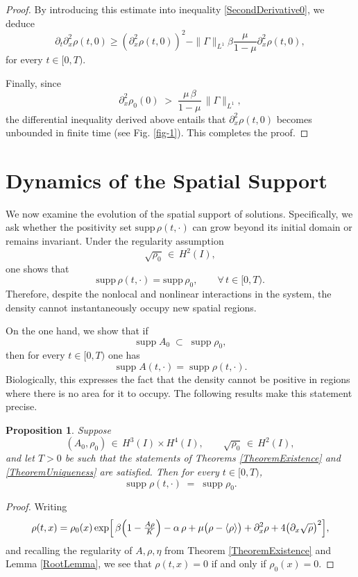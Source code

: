 \documentclass[12pt]{amsart}
\newtheorem{proposition}{Proposition}
\begin{document}
\begin{proof}
	By introducing this estimate into inequality \eqref{SecondDerivative0}, we deduce 
	\begin{equation}
		\partial_t\partial_{x}^2\rho(t,0)\geq(\partial_{x}^2\rho(t,0))^2-\|\Gamma\|_{L^1}\beta\frac{\mu}{1-\mu}\partial_{x}^2\rho(t,0),
	\end{equation}
	for every $t\in[0,T)$.
	
	Finally, since
\[
\partial_{x}^2\rho_0(0) \;>\;\frac{\mu\,\beta}{1-\mu}\,\|\Gamma\|_{L^1},
\]
the differential inequality derived above entails that $\partial_x^2\rho(t,0)$ becomes unbounded in finite time (see Fig. \ref{fig-1}). This completes the proof.  
\end{proof}

\section{Dynamics of the Spatial Support}
\label{sec5}


We now examine the evolution of the spatial support of solutions. Specifically, we ask whether the positivity set 
$\mathrm{supp}\,\rho(t,\cdot)$ can grow beyond its initial domain or remains invariant. Under the regularity assumption
\[
\sqrt{\rho_0}\,\in\,H^2(I),
\]
one shows that
\[
\mathrm{supp}\,\rho(t,\cdot)
=\mathrm{supp}\,\rho_0,
\qquad
\forall\,t\in[0,T).
\]
Therefore, despite the nonlocal and nonlinear interactions in the system, the density cannot instantaneously occupy new spatial regions.

On the one hand, we show that if 
\[
\operatorname{supp}A_{0}\;\subset\;\operatorname{supp}\rho_{0},
\]
then for every $t\in[0,T)$ one has
\[
\operatorname{supp}A(t,\cdot)
=\operatorname{supp}\rho(t,\cdot).
\]
Biologically, this expresses the fact that the density cannot be positive in regions where there is no area for it to occupy. The following results make this statement precise.

\begin{proposition}\label{SupportRho}
Suppose
\[
(A_0,\rho_0)\,\in\,H^3(I)\times H^4(I),
\qquad
\sqrt{\rho_0}\,\in\,H^2(I),
\]
and let $T>0$ be such that the statements of Theorems \ref{TheoremExistence} and \ref{TheoremUniqueness} are satisfied.
Then for every $t\in[0,T)$,
\[
\operatorname{supp}\rho(t,\cdot)
\;=\;
\operatorname{supp}\rho_0.
\]
\end{proposition}

\begin{proof}
	Writing
\[
\rho(t,x)
= \rho_0(x)\exp\Bigl[\,
\beta\Bigl(1-\tfrac{A\rho}{K}\Bigr)
-\alpha\,\rho
+\mu\bigl(\rho-\langle\rho\rangle\bigr)
+\partial_x^2\rho
+4\bigl(\partial_x\sqrt{\rho}\bigr)^2
\Bigr],
\]
and recalling the regularity of $A,\rho,\eta$ from Theorem \ref{TheoremExistence} and Lemma \ref{RootLemma}, we see that
$\rho(t,x)=0$ if and only if $\rho_0(x)=0$.
\end{proof}
\end{document}
